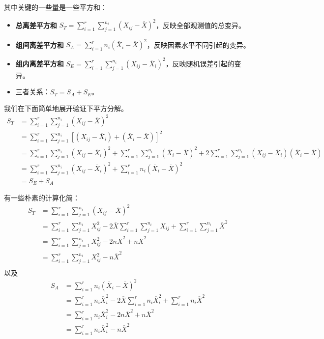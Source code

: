 其中关键的一些量是一些平方和：
\begin{itemize}
\item \textbf{总离差平方和} $S_T = \sum_{i=1}^r \sum_{j=1}^{n_i} (X_{ij} - \overline{X})^2$，反映全部观测值的总变异。
\item \textbf{组间离差平方和} $S_A = \sum_{i=1}^r n_i (\overline{X}_i - \overline{X})^2$，反映因素水平不同引起的变异。
\item \textbf{组内离差平方和} $S_E = \sum_{i=1}^r \sum_{j=1}^{n_i} (X_{ij} - \overline{X}_i)^2$，反映随机误差引起的变异。
\item 三者关系：$S_T = S_A + S_E$。
\end{itemize}

我们在下面简单地展开验证下平方分解。
\begin{align*}
S_T &= \sum_{i=1}^r \sum_{j=1}^{n_i} (X_{ij} - \overline{X})^2\\
&= \sum_{i=1}^r \sum_{j=1}^{n_i} [(X_{ij} - \overline{X}_i) + (\overline{X}_i - \overline{X})]^2 \\
&= \sum_{i=1}^r \sum_{j=1}^{n_i} (X_{ij} - \overline{X}_i)^2 + \sum_{i=1}^r \sum_{j=1}^{n_i} (\overline{X}_i - \overline{X})^2 + 2\sum_{i=1}^r \sum_{j=1}^{n_i} (X_{ij} - \overline{X}_i)(\overline{X}_i - \overline{X}) \\
&= \sum_{i=1}^r \sum_{j=1}^{n_i} (X_{ij} - \overline{X}_i)^2 + \sum_{i=1}^r n_i(\overline{X}_i - \overline{X})^2\\
&= S_E+S_A
\end{align*}

有一些朴素的计算化简：
\begin{align*}
S_T &= \sum_{i=1}^r \sum_{j=1}^{n_i} (X_{ij} - \overline{X})^2\\
&= \sum_{i=1}^r \sum_{j=1}^{n_i} X_{ij}^2 - 2\overline{X}\sum_{i=1}^r \sum_{j=1}^{n_i}X_{ij} + \sum_{i=1}^r \sum_{j=1}^{n_i}\overline{X}^2\\
&= \sum_{i=1}^r \sum_{j=1}^{n_i} X_{ij}^2 - 2n\overline{X}^2 + n\overline{X}^2\\
&= \sum_{i=1}^r \sum_{j=1}^{n_i} X_{ij}^2 - n\overline{X}^2\\
\end{align*}
以及
\begin{align*}
S_A &= \sum_{i=1}^r n_i (\overline{X}_i - \overline{X})^2\\
&= \sum_{i=1}^r n_i \overline{X}_i^2 -2\overline{X}\sum_{i=1}^r n_i\overline{X}_i^2 + \sum_{i=1}^r n_i\overline{X}^2\\
&= \sum_{i=1}^r n_i \overline{X}_i^2 -2n\overline{X}^2  + n\overline{X}^2\\
&= \sum_{i=1}^r n_i \overline{X}_i^2 -n\overline{X}^2
\end{align*}

